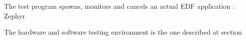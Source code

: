 The test program  spawns, monitors and
cancels an actual EDF application : Zephyr.

The hardware and software testing environment  is the one described at section 




